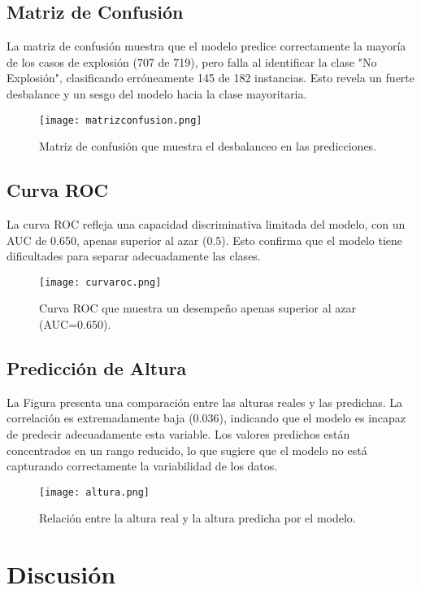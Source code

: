 \documentclass[11pt,a4paper]{article}
\begin{document}
\subsection{Matriz de Confusión}
La matriz de confusión muestra que el modelo predice correctamente la mayoría de los casos de explosión (707 de 719), pero falla al identificar la clase "No Explosión", clasificando erróneamente 145 de 182 instancias. Esto revela un fuerte desbalance y un sesgo del modelo hacia la clase mayoritaria.

\begin{figure}[H]
    \centering
    \texttt{[image: matrizconfusion.png]}
    \caption{Matriz de confusión que muestra el desbalanceo en las predicciones.}
    \label{fig:confusion_matrix}
\end{figure}

\subsection{Curva ROC}
La curva ROC refleja una capacidad discriminativa limitada del modelo, con un AUC de 0.650, apenas superior al azar (0.5). Esto confirma que el modelo tiene dificultades para separar adecuadamente las clases.

\begin{figure}[H]
    \centering
    \texttt{[image: curvaroc.png]}
    \caption{Curva ROC que muestra un desempeño apenas superior al azar (AUC=0.650).}
    \label{fig:roc_curve}
\end{figure}

\subsection{Predicción de Altura}
La Figura presenta una comparación entre las alturas reales y las predichas. La correlación es extremadamente baja (0.036), indicando que el modelo es incapaz de predecir adecuadamente esta variable. Los valores predichos están concentrados en un rango reducido, lo que sugiere que el modelo no está capturando correctamente la variabilidad de los datos.

\begin{figure}[H]
    \centering
    \texttt{[image: altura.png]}
    \caption{Relación entre la altura real y la altura predicha por el modelo.}
    \label{fig:altura}
\end{figure}

\section{Discusión}
\end{document}

